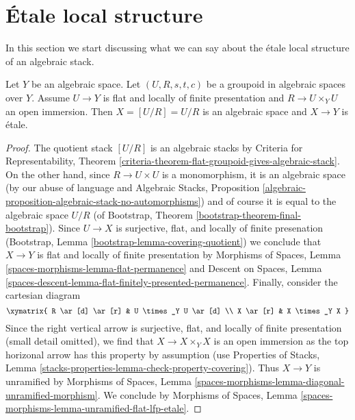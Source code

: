 


\section{\'Etale local structure}
\label{section-etale-local}

\noindent
In this section we start discussing what we can say
about the \'etale local structure of an algebraic stack.

\begin{lemma}
\label{lemma-quotient-etale}
Let $Y$ be an algebraic space.
Let $(U, R, s, t, c)$ be a groupoid in algebraic spaces over $Y$.
Assume $U \to Y$ is flat and locally of finite presentation
and $R \to U \times_Y U$ an open immersion.
Then $X = [U/R] = U/R$ is an algebraic space and $X \to Y$
is \'etale.
\end{lemma}

\begin{proof}
The quotient stack $[U/R]$ is an algebraic stacks by
Criteria for Representability, Theorem
\ref{criteria-theorem-flat-groupoid-gives-algebraic-stack}.
On the other hand, since $R \to U \times U$ is a monomorphism,
it is an algebraic space (by our abuse of language and
Algebraic Stacks, Proposition
\ref{algebraic-proposition-algebraic-stack-no-automorphisms})
and of course it is equal to the algebraic space $U/R$
(of Bootstrap, Theorem \ref{bootstrap-theorem-final-bootstrap}).
Since $U \to X$ is surjective, flat, and locally of finite presenation
(Bootstrap, Lemma \ref{bootstrap-lemma-covering-quotient})
we conclude that $X \to Y$ is flat and locally of finite presentation by
Morphisms of Spaces, Lemma \ref{spaces-morphisms-lemma-flat-permanence}
and
Descent on Spaces, Lemma
\ref{spaces-descent-lemma-flat-finitely-presented-permanence}.
Finally, consider the cartesian diagram
$$
\xymatrix{
R \ar[d] \ar[r] & U \times_Y U \ar[d] \\
X \ar[r] & X \times_Y X
}
$$
Since the right vertical arrow is surjective, flat, and
locally of finite presentation (small detail omitted), we
find that $X \to X \times_Y X$ is an open immersion as the top horizonal arrow
has this property by assumption (use
Properties of Stacks, Lemma
\ref{stacks-properties-lemma-check-property-covering}).
Thus $X \to Y$ is unramified by
Morphisms of Spaces, Lemma
\ref{spaces-morphisms-lemma-diagonal-unramified-morphism}.
We conclude by
Morphisms of Spaces, Lemma
\ref{spaces-morphisms-lemma-unramified-flat-lfp-etale}.
\end{proof}

